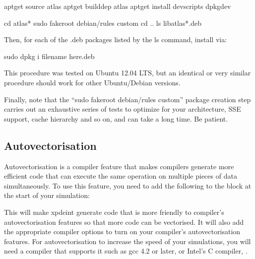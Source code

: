 \documentclass[letterpaper,10pt,english]{sphinxmanual}
\begin{document}
\begin{sphinxVerbatim}[commandchars=\\\{\}]
apt\PYGZhy{}get source atlas
apt\PYGZhy{}get build\PYGZhy{}dep atlas
apt\PYGZhy{}get install devscripts dpkg\PYGZhy{}dev

cd atlas\PYGZhy{}*
sudo fakeroot debian/rules custom
cd ..
ls libatlas*.deb
\end{sphinxVerbatim}

\sphinxAtStartPar
Then, for each of the .deb packages listed by the ls command, install via:

\begin{sphinxVerbatim}[commandchars=\\\{\}]
sudo dpkg \PYGZhy{}i \PYGZdq{}filename here\PYGZdq{}.deb
\end{sphinxVerbatim}

\sphinxAtStartPar
This procedure was tested on Ubuntu 12.04 LTS, but an identical or very similar procedure should work for other Ubuntu/Debian versions.

\sphinxAtStartPar
Finally, note that the “sudo fakeroot debian/rules custom” package creation step carries out an exhaustive series of tests to optimize for your architecture, SSE support, cache hierarchy and so on, and can take a long time. Be patient.


\subsection{Auto\sphinxhyphen{}vectorisation}
\label{\detokenize{optimisation_hints:auto-vectorisation}}
\sphinxAtStartPar
Auto\sphinxhyphen{}vectorisation is a compiler feature that makes compilers generate more efficient code that can execute the same operation on multiple pieces of data simultaneously. To use this feature, you need to add the following to the  block at the start of your simulation:

\begin{sphinxVerbatim}[commandchars=\\\{\}]
 
\end{sphinxVerbatim}

\sphinxAtStartPar
This will make xpdeint generate code that is more friendly to compiler’s auto\sphinxhyphen{}vectorisation features so that more code can be vectorised. It will also add the appropriate compiler options to turn on your compiler’s auto\sphinxhyphen{}vectorisation features. For auto\sphinxhyphen{}vectorisation to increase the speed of your simulations, you will need a compiler that supports it such as gcc 4.2 or later, or Intel’s C compiler, .
\end{document}
